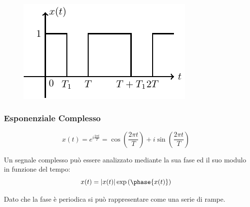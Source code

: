 \documentclass{article}
\numberwithin{equation}{subsection}
\begin{document}
\begin{figure}[H]%
    \centering
    \includegraphics{onda-quadra.pdf}%
\end{figure}

\subsubsection{Esponenziale Complesso}

\begin{equation}
    x(t)=\displaystyle e^{i\frac{2\pi t}{T}}=\cos\left(\frac{2\pi t}{T}\right)+i\sin\left(\frac{2\pi t}{T}\right)
\end{equation}

Un segnale complesso può essere analizzato mediante la sua fase ed il suo modulo in funzione del tempo:
\begin{equation*}
    x(t)=|x(t)|\exp\left({\phase{x(t)}}\right)
\end{equation*}

Dato che la fase è periodica si può rappresentare come una serie di rampe.

\begin{figure}[H]%
    \centering
    \qquad
\end{figure}
\end{document}
